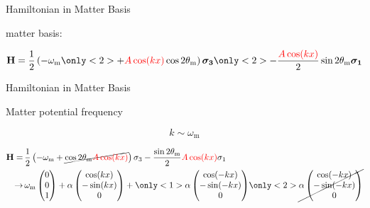 \documentclass[9pt]{beamer}
\begin{document}
\begin{darkframes}
\begin{frame}{Hamiltonian in Matter Basis}


\begin{tcolorbox}[title=Basis]

 matter basis:


\begin{equation*}
    \mathbf H = \frac{1}{2}\left( - \omega_{\mathrm{m}}
    \only<2>{
    + {\color{red}A\cos(kx)} \cos 2\theta_{\mathrm{m}}
    }
    \right) \boldsymbol{\sigma_3}
    \only<2>{
    - \frac{{\color{red}A\cos(kx) } }{2} \sin 2\theta_{\mathrm{m}} \boldsymbol{\sigma_1}
    }
\end{equation*}


\end{tcolorbox}






\end{frame}






\begin{frame}{Hamiltonian in Matter Basis}




Matter potential frequency

\begin{equation*}
    k\sim \omega_{\mathrm m}
\end{equation*}


\begin{align*}
    \mathbf {H} =\,& \frac{1}{2}\left( - \omega_{\mathrm{m}}
    +\cancel{
     \cos 2\theta_{\mathrm{m}}{\color{red}A\cos(kx)} } \right) \sigma_3 - \frac{  \sin 2\theta_{\mathrm{m}
    }
    }{2}{\color{red}A \cos(kx)}  \sigma_1 \\
    \to\, &  \omega_{\mathrm m}\begin{pmatrix}
    0\\
    0\\
    1
    \end{pmatrix} + \alpha \begin{pmatrix}
    \cos (kx)\\
    -\sin(k x)\\
    0
    \end{pmatrix}  + \only<1>{\alpha \begin{pmatrix}
    \cos (-kx)\\
    -\sin( - k x)\\
    0
    \end{pmatrix}
    }
    \only<2>{\cancel{\alpha \begin{pmatrix}
    \cos (-kx)\\
    -\sin( - k x)\\
    0
    \end{pmatrix}
    }
    }
\end{align*}


\end{frame}
\end{darkframes}
\end{document}
